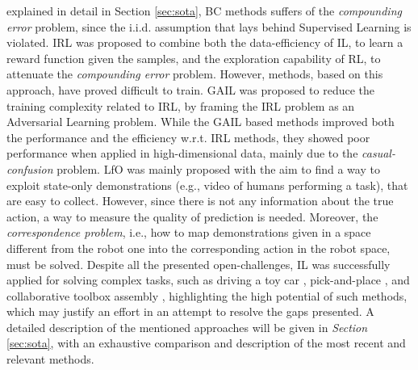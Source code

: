 explained in detail in Section \ref{sec:sota}, BC methods suffers of the \textit{compounding error} problem, since the
i.i.d. assumption that lays behind Supervised Learning is violated. IRL was proposed to combine both the
data-efficiency of IL, to learn a reward function given the samples, and the exploration capability of RL, to attenuate
the \textit{compounding error} problem. However, methods, based on this approach, have proved difficult to train. GAIL was proposed to reduce
the training complexity related to IRL, by framing the IRL problem as an Adversarial Learning problem. While the GAIL based methods
improved both the performance and the efficiency w.r.t. IRL methods, they showed poor performance when applied in
high-dimensional data, mainly due to the \textit{casual-confusion} problem. LfO was mainly proposed with
the aim to find a way to exploit state-only demonstrations (e.g., video of humans performing a task), that are easy to collect. However, since
there is not any information about the true action, a way to measure the quality of prediction is needed. Moreover, the
\textit{correspondence problem}, i.e., how to map demonstrations given in a space different from the robot one into the corresponding action in the robot space, must be solved.
\newline Despite all the presented open-challenges, IL was successfully applied for solving complex tasks, such as
driving a toy car \cite{codevilla2018end_to_end}, pick-and-place \cite{zhang2018deep_vr_teleoperation}, and collaborative toolbox
assembly \cite{maeda2017probabilistic}, highlighting the high potential of such methods, which may justify an effort in
an attempt to resolve the gaps presented. A detailed description of the mentioned approaches will be given in
\textit{Section} \ref{sec:sota}, with an exhaustive comparison and description of the most recent and relevant methods.


